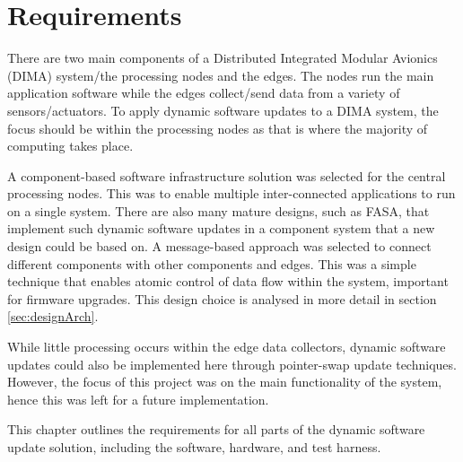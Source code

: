\chapter{Requirements}





There are two main components of a Distributed Integrated Modular Avionics (DIMA) system/the processing nodes and the edges. The nodes run the main application software while the edges collect/send data from a variety of sensors/actuators. To apply dynamic software updates to a DIMA system, the focus should be within the processing nodes as that is where the majority of computing takes place.

A component-based software infrastructure solution was selected for the central processing nodes. This was to enable multiple inter-connected applications to run on a single system. There are also many mature designs, such as FASA, that implement such dynamic software updates in a component system that a new design could be based on. A message-based approach was selected to connect different components with other components and edges. This was a simple technique that enables atomic control of data flow within the system, important for firmware upgrades. This design choice is analysed in more detail in section \ref{sec:designArch}.



While little processing occurs within the edge data collectors, dynamic software updates could also be implemented here through pointer-swap update techniques. However, the focus of this project was on the main functionality of the system, hence this was left for a future implementation.

This chapter outlines the requirements for all parts of the dynamic software update solution, including the software, hardware, and test harness.

\clearpage


